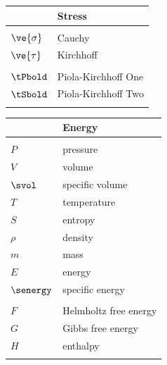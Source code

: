 \noindent \begin{tabular}{ll} \hline
 & {\bf Stress} \\ \hline 
\hspace{0.2\textwidth} & \hspace{0.745\textwidth} \\
$\ve{\sigma}$ & 
Cauchy
\\
$\ve{\tau}$ &
Kirchhoff
\\
& \\
$\tPbold$ & 
Piola-Kirchhoff One
\\
$\tSbold$ &
Piola-Kirchhoff Two
\\
& \\ \end{tabular}

\noindent \begin{tabular}{ll} \hline
 & {\bf Energy} \\ \hline 
\hspace{0.2\textwidth} & \hspace{0.745\textwidth} \\
$P$ & 
pressure
\\
$V$ & 
volume 
\\
$\svol$ & 
specific volume
\\
$T$ & 
temperature
\\
$S$ & 
entropy
\\
$\rho$ &
density
\\
$m$ &
mass
\\
$E$ & 
energy
\\
$\senergy$ & 
specific energy
\\
& \\
$F$ & 
Helmholtz free energy
\\
$G$ &
Gibbs free energy
\\
$H$ & 
enthalpy
\\
& \\ \end{tabular}




\newpage

